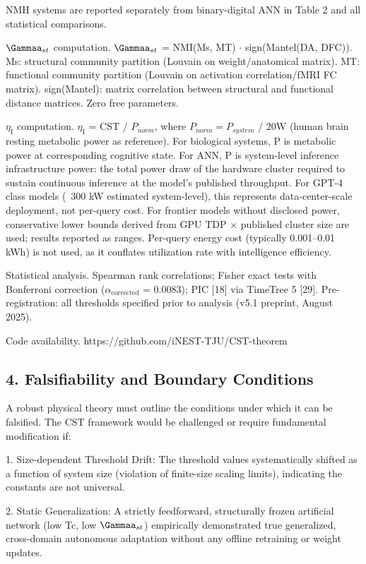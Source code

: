 \documentclass[a4paper,12pt]{article}
\begin{document}
\dag{}NMH systems are reported separately from binary-digital ANN in Table 2 and all statistical comparisons.

$\Gammaa_{st}$ computation. $\Gammaa_{st}$ = NMI(Ms, MT)  $\cdot$  sign(Mantel(DA, DFC)). Ms: structural community partition (Louvain on weight/anatomical matrix). MT: functional community partition (Louvain on activation correlation/fMRI FC matrix). sign(Mantel): matrix correlation between structural and functional distance matrices. Zero free parameters.

$\eta_{\text{I}}$ computation. $\eta_{\text{I}}$ = CST / $P_{norm}$, where $P_{norm} = P_{system}$ / 20W (human brain resting metabolic power as reference).
For biological systems, P is metabolic power at corresponding cognitive state.
For ANN, P is system-level inference infrastructure power: the total power draw of the hardware cluster required to sustain continuous inference at the model's published throughput.
For GPT-4 class models (~300 kW estimated system-level), this represents data-center-scale deployment, not per-query cost.
For frontier models without disclosed power, conservative lower bounds derived from GPU TDP  $\times$  published cluster size are used; results reported as ranges.
Per-query energy cost (typically 0.001--0.01 kWh) is not used, as it conflates utilization rate with intelligence efficiency.

Statistical analysis. Spearman rank correlations; Fisher exact tests with Bonferroni correction ($\alpha_{\text{corrected}}$ = 0.0083); PIC [18] via TimeTree 5 [29]. Pre-registration: all thresholds specified prior to analysis (v5.1 preprint, August 2025).

Code availability. https://github.com/iNEST-TJU/CST-theorem

\subsection{4. Falsifiability and Boundary Conditions}

A robust physical theory must outline the conditions under which it can be falsified. The CST framework would be challenged or require fundamental modification if:

1. Size-dependent Threshold Drift: The threshold values systematically shifted as a function of system size (violation of finite-size scaling limits), indicating the constants are not universal.

2. Static Generalization: A strictly feedforward, structurally frozen artificial network (low Tc, low $\Gammaa_{st}$) empirically demonstrated true generalized, cross-domain autonomous adaptation without any offline retraining or weight updates.
\end{document}
